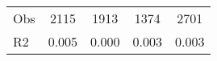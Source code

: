 \begin{tabular}{l*{4}{c}}
\hline                                                                                                                                                                                                                                            
 Obs                   &               2115               &       1913                       &       1374                &              2701                                               \\ 
 R2                    &                      0.005              &              0.000                      &              0.003               &                     0.003                                              \\ 
\hline \end{tabular}                                                                                                                                                                                                              